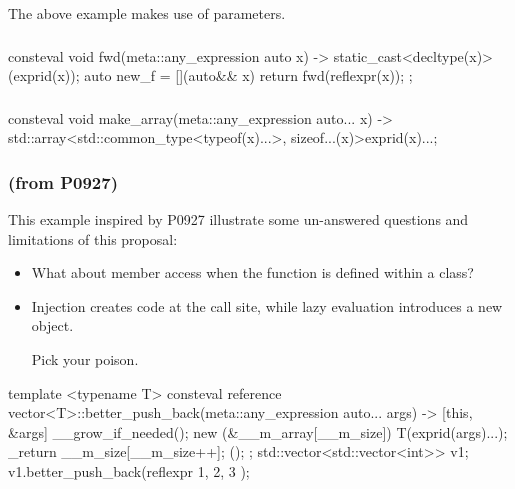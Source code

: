 \documentclass{wg21}
\begin{document}
The above example makes use of  parameters.

\subsubsection{}


\begin{codeblock}
consteval void fwd(meta::any_expression auto x) {
    -> static_cast<decltype(x)>(exprid(x));
}
auto new_f = [](auto&& x) { return fwd(reflexpr(x)); };
\end{codeblock}

\subsubsection{}

\begin{codeblock}
consteval void make_array(meta::any_expression auto... x) {
    -> std::array<std::common_type<typeof(x)...>, sizeof...(x)>{exprid(x)...};
}
\end{codeblock}

\subsubsection{ (from P0927)}

This example inspired by P0927 \cite{P0927R2} illustrate some un-answered questions and limitations of this proposal:
\begin{itemize}
    \item What about member access when the  function is defined within a class?
    \item Injection creates code at the call site, while lazy evaluation introduces a new object. 

Pick your poison.
\end{itemize}

\begin{codeblock}
template <typename T>
consteval reference vector<T>::better_push_back(meta::any_expression auto... args) {
   -> { [this, &args]{ 
       __grow_if_needed();
       new (&__m_array[__m_size]) T(exprid(args)...);
       _return __m_size[__m_size++];
    }();
   };
}
std::vector<std::vector<int>> v1;
v1.better_push_back(reflexpr{ 1, 2, 3 });
\end{codeblock}

\subsubsection{}
\end{document}
